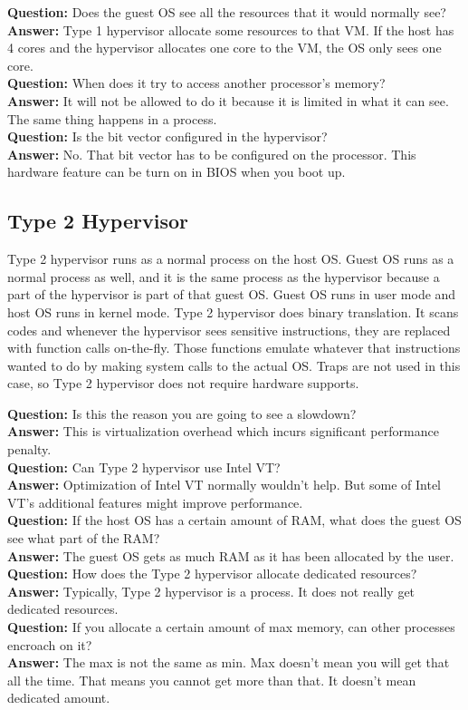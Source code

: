 \documentclass[twoside]{article}
\newcommand{\que}[1]{\textbf{Question:} #1\\}
\newcommand{\ans}[1]{\textbf{Answer:} #1\\}
\begin{document}
\que{Does the guest OS see all the resources that it would normally see?}
\ans{Type 1 hypervisor allocate some resources to that VM. If the host has 4 cores and the hypervisor allocates one core to the VM, the OS only sees one core.}

\que{When does it try to access another processor's memory?}
\ans{It will not be allowed to do it because it is limited in what it can see. The same thing happens in a process.}

\que{Is the bit vector configured in the hypervisor?}
\ans{No. That bit vector has to be configured on the processor. This hardware feature can be turn on in BIOS when you boot up.}

\subsection{Type 2 Hypervisor}

Type 2 hypervisor runs as a normal process on the host OS. Guest OS runs as a normal process as well, and it is the same process as the hypervisor because a part of the hypervisor is part of that guest OS. Guest OS runs in user mode and host OS runs in kernel mode. Type 2 hypervisor does binary translation. It scans codes and whenever the hypervisor sees sensitive instructions, they are replaced with function calls on-the-fly. Those functions emulate whatever that instructions wanted to do by making system calls to the actual OS. Traps are not used in this case, so Type 2 hypervisor does not require hardware supports.

\que{Is this the reason you are going to see a slowdown?}
\ans{This is virtualization overhead which incurs significant performance penalty.}

\que{Can Type 2 hypervisor use Intel VT?}
\ans{Optimization of Intel VT normally wouldn't help. But some of Intel VT's additional features might improve performance.}

\que{If the host OS has a certain amount of RAM, what does the guest OS see what part of the RAM?}
\ans{The guest OS gets as much RAM as it has been allocated by the user.}

\que{How does the Type 2 hypervisor allocate dedicated resources?}
\ans{Typically, Type 2 hypervisor is a process. It does not really get dedicated resources.}

\que{If you allocate a certain amount of max memory, can other processes encroach on it?}
\ans{The max is not the same as min. Max doesn't mean you will get that all the time. That means you cannot get more than that. It doesn't mean dedicated amount.}
\end{document}
